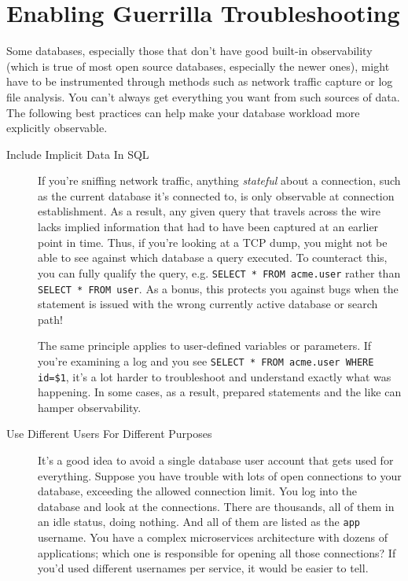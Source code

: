 \documentclass{vivid_layout}
\begin{document}
\section{Enabling Guerrilla Troubleshooting}

Some databases, especially those that don't have good built-in observability
(which is true of most open source databases, especially the newer ones), might
have to be instrumented through methods such as network traffic capture or log file
analysis. You can't always get everything you want from such sources of data.
The following best practices can help make your database workload more
explicitly observable.

\begin{description}

\item[Include Implicit Data In SQL]
If you're sniffing network traffic, anything \emph{stateful} about
a connection, such as the current database it's connected to, is only observable at
connection establishment. As a result, any given query that travels across the wire 
lacks implied information that had to have been captured at an earlier point
in time. Thus, if you're looking at a TCP dump, you might not be able to see
against which database a query executed. To counteract this, you can fully
qualify the query, e.g. \texttt{SELECT * FROM acme.user} rather than
\texttt{SELECT * FROM user}. As a bonus, this protects you against bugs when the
statement is issued with the wrong currently active database or search path!

The same principle applies to user-defined variables or parameters. If you're
examining a log and you see \texttt{SELECT * FROM acme.user WHERE id=\$1}, it's a
lot harder to troubleshoot and understand exactly what was happening. In some
cases, as a result, prepared statements and the like can hamper observability.

\item[Use Different Users For Different Purposes] It's a good idea to
avoid a single database user account that gets used for everything. Suppose you
have trouble with lots of open connections to your database, exceeding the
allowed connection limit. You log into the database and look at the connections.
There are thousands, all of them in an idle status, doing nothing. And all of
them are listed as the \texttt{app} username. You have a complex microservices
architecture with dozens of applications; which one is responsible for opening
all those connections? If you'd used different usernames per service, it would be
easier to tell.


\end{description}
\end{document}
